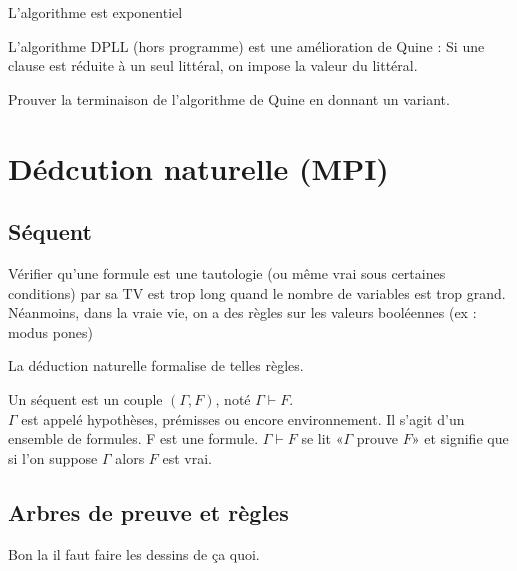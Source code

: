 \begin{rem}
	L'algorithme est exponentiel
\end{rem}

\begin{rem}
	L'algorithme DPLL (hors programme) est une amélioration de Quine : Si une clause est réduite à un seul littéral, on impose la valeur du littéral. 
\end{rem}

\begin{exercise}
	Prouver la terminaison de l'algorithme de Quine en donnant un variant.
\end{exercise}

\section{Dédcution naturelle (MPI)}

\subsection{Séquent}

Vérifier qu'une formule est une tautologie (ou même vrai sous certaines conditions) par sa TV est trop long quand le nombre de variables est trop grand. Néanmoins, dans la vraie vie, on a des règles sur les valeurs booléennes (ex : modus pones)

La déduction naturelle formalise de telles règles.

\begin{definition}
	Un séquent est un couple $(\Gamma, F)$, noté $\Gamma \vdash F$.\\
	
	$\Gamma$ est appelé hypothèses, prémisses ou encore environnement. Il s'agit d'un ensemble de formules. F est une formule. $\Gamma \vdash F$ se lit «$\Gamma$ prouve $F$» et signifie que si l'on suppose $\Gamma$ alors $F$ est vrai.
\end{definition}

\subsection{Arbres de preuve et règles}

\begin{com}
	Bon la il faut faire les dessins de ça quoi.
\end{com}